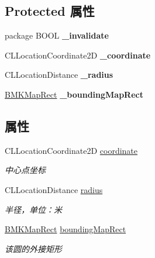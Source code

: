 \subsection*{Protected 属性}
\begin{DoxyCompactItemize}
\item 
\hypertarget{interface_b_m_k_circle_a2dffabfbaa1ac6642adc5a475d6ee453}{package B\+O\+O\+L {\bfseries \+\_\+invalidate}}\label{interface_b_m_k_circle_a2dffabfbaa1ac6642adc5a475d6ee453}

\item 
\hypertarget{interface_b_m_k_circle_abdd404f22d461b81d8d4d203778cee58}{C\+L\+Location\+Coordinate2\+D {\bfseries \+\_\+coordinate}}\label{interface_b_m_k_circle_abdd404f22d461b81d8d4d203778cee58}

\item 
\hypertarget{interface_b_m_k_circle_a84860dbbaa96509cfa4c7590908aabe8}{C\+L\+Location\+Distance {\bfseries \+\_\+radius}}\label{interface_b_m_k_circle_a84860dbbaa96509cfa4c7590908aabe8}

\item 
\hypertarget{interface_b_m_k_circle_abfa42e25c856dd426fb74b9531e1061b}{\hyperlink{struct_b_m_k_map_rect}{B\+M\+K\+Map\+Rect} {\bfseries \+\_\+bounding\+Map\+Rect}}\label{interface_b_m_k_circle_abfa42e25c856dd426fb74b9531e1061b}

\end{DoxyCompactItemize}
\subsection*{属性}
\begin{DoxyCompactItemize}
\item 
\hypertarget{interface_b_m_k_circle_a1c516c10dec1971c686e07f814f333f9}{C\+L\+Location\+Coordinate2\+D \hyperlink{interface_b_m_k_circle_a1c516c10dec1971c686e07f814f333f9}{coordinate}}\label{interface_b_m_k_circle_a1c516c10dec1971c686e07f814f333f9}

\begin{DoxyCompactList}\small\item\em 中心点坐标 \end{DoxyCompactList}\item 
\hypertarget{interface_b_m_k_circle_a42507e4c17b4a1c1309fcbe06e370bf5}{C\+L\+Location\+Distance \hyperlink{interface_b_m_k_circle_a42507e4c17b4a1c1309fcbe06e370bf5}{radius}}\label{interface_b_m_k_circle_a42507e4c17b4a1c1309fcbe06e370bf5}

\begin{DoxyCompactList}\small\item\em 半径，单位：米 \end{DoxyCompactList}\item 
\hypertarget{interface_b_m_k_circle_a462a1696e47b1523dd481b22d43bcf46}{\hyperlink{struct_b_m_k_map_rect}{B\+M\+K\+Map\+Rect} \hyperlink{interface_b_m_k_circle_a462a1696e47b1523dd481b22d43bcf46}{bounding\+Map\+Rect}}\label{interface_b_m_k_circle_a462a1696e47b1523dd481b22d43bcf46}

\begin{DoxyCompactList}\small\item\em 该圆的外接矩形 \end{DoxyCompactList}\end{DoxyCompactItemize}
